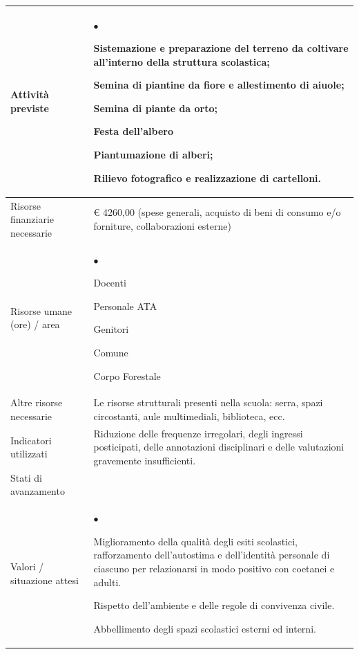 \documentclass[12pt,a4paper,oneside]{memoir}
\newenvironment{elenco}{\begin{list}{$\bullet$}{%
              \setlength{\leftmargin}{4mm}%
              \setlength{\rightmargin}{1mm}%
               \setlength{\itemindent}{0mm}%
               \setlength{\labelwidth}{2mm}%
               \setlength{\labelsep}{2mm}%
              \setlength{\itemsep}{-\parsep}%
              \setlength{\partopsep}{0pt}%
              \setlength{\topsep}{0pt}%
             \setlength{\parskip}{0pt}%
              }}{\end{list}}
\begin{document}
\begin{footnotesize}
\begin{longtable}{|>{\raggedright}p{2.5cm}|>{\raggedright\arraybackslash}P{10cm}|}
Attività previste&
\begin{elenco}
\item Sistemazione e preparazione del terreno da coltivare all'interno della struttura scolastica;
\item Semina di piantine da fiore e allestimento di aiuole;    
\item Semina di piante da orto;
\item Festa dell'albero 
\item Piantumazione di alberi;
\item Rilievo fotografico e realizzazione di cartelloni.
\end{elenco}\\ \hline
Risorse finanziarie necessarie&€ 4260,00 (spese generali, acquisto di beni di consumo e/o forniture, collaborazioni esterne)\\ \hline
Risorse umane (ore) / area&
\begin{elenco}
\item Docenti 
\item Personale ATA 
\item Genitori
\item Comune
\item Corpo Forestale
\end{elenco}\\ \hline
Altre risorse necessarie&Le risorse strutturali presenti nella scuola: serra, spazi circostanti, aule multimediali, biblioteca, ecc.\\ \hline
Indicatori utilizzati&Riduzione delle frequenze irregolari, degli ingressi posticipati, delle annotazioni disciplinari e delle valutazioni gravemente insufficienti. \\ \hline
Stati di avanzamento&\\ \hline
Valori / situazione attesi&
\begin{elenco}
\item Miglioramento della qualità degli esiti scolastici, rafforzamento dell'autostima e dell'identità personale di ciascuno per relazionarsi in modo positivo con coetanei e adulti.
\item Rispetto dell'ambiente e delle regole di convivenza civile.
\item Abbellimento degli spazi scolastici esterni ed interni.
\end{elenco}\\ \hline
\end{longtable}
\end{footnotesize}
\end{document}
